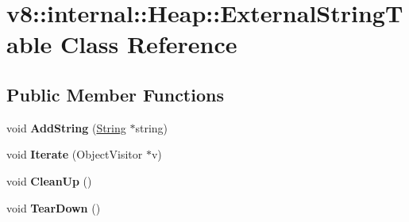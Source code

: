 \hypertarget{classv8_1_1internal_1_1_heap_1_1_external_string_table}{}\section{v8\+:\+:internal\+:\+:Heap\+:\+:External\+String\+Table Class Reference}
\label{classv8_1_1internal_1_1_heap_1_1_external_string_table}
\subsection*{Public Member Functions}
\begin{DoxyCompactItemize}
\item 
void {\bfseries Add\+String} (\hyperlink{classv8_1_1internal_1_1_string}{String} $\ast$string)\hypertarget{classv8_1_1internal_1_1_heap_1_1_external_string_table_a2dfa81527d4afbc796afccd065294d5f}{}\label{classv8_1_1internal_1_1_heap_1_1_external_string_table_a2dfa81527d4afbc796afccd065294d5f}

\item 
void {\bfseries Iterate} (Object\+Visitor $\ast$v)\hypertarget{classv8_1_1internal_1_1_heap_1_1_external_string_table_ae8394ad4a101effda7adf8811e97eba7}{}\label{classv8_1_1internal_1_1_heap_1_1_external_string_table_ae8394ad4a101effda7adf8811e97eba7}

\item 
void {\bfseries Clean\+Up} ()\hypertarget{classv8_1_1internal_1_1_heap_1_1_external_string_table_a84314f9458a56c545f11d27535cef05c}{}\label{classv8_1_1internal_1_1_heap_1_1_external_string_table_a84314f9458a56c545f11d27535cef05c}

\item 
void {\bfseries Tear\+Down} ()\hypertarget{classv8_1_1internal_1_1_heap_1_1_external_string_table_a281d12ac2974801f989caa390a25e7d2}{}\label{classv8_1_1internal_1_1_heap_1_1_external_string_table_a281d12ac2974801f989caa390a25e7d2}

\end{DoxyCompactItemize}
